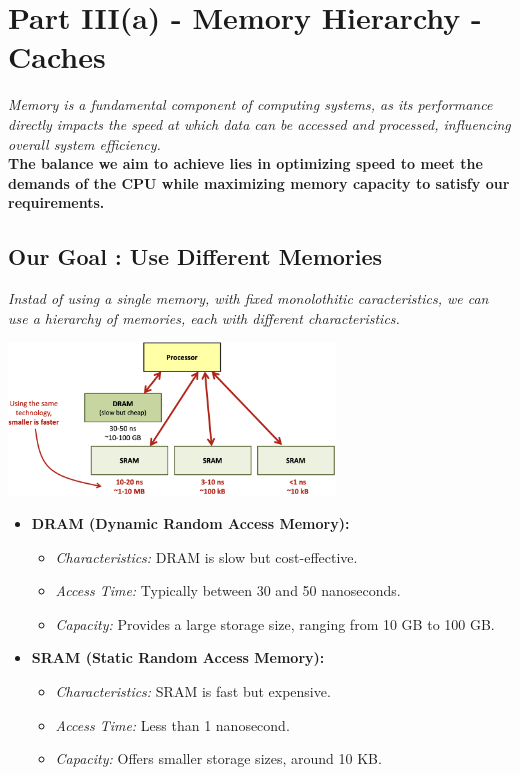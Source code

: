 \chapter{Part III(a) - Memory Hierarchy - Caches}
\textit{Memory is a fundamental component of computing systems, as its performance directly impacts the speed at which data can be accessed and processed, influencing overall system efficiency.} \\
\textbf{The balance we aim to achieve lies in optimizing speed to meet the demands of the CPU while maximizing memory capacity to satisfy our requirements.}
\section{Our Goal : Use Different Memories}
\textit{Instad of using a single memory, with fixed monolothitic caracteristics, we can use a hierarchy of memories, each with different characteristics.}
\begin{center}
    \includegraphics[width=0.65\textwidth]{chapters/chapter3a/images/hierarchy.png}
\end{center}
\begin{itemize}
    \item \textbf{DRAM (Dynamic Random Access Memory):}
    \begin{itemize}
        \item \textit{Characteristics:} DRAM is slow but cost-effective.
        \item \textit{Access Time:} Typically between 30 and 50 nanoseconds.
        \item \textit{Capacity:} Provides a large storage size, ranging from 10 GB to 100 GB.
    \end{itemize}
    
    \item \textbf{SRAM (Static Random Access Memory):}
    \begin{itemize}
        \item \textit{Characteristics:} SRAM is fast but expensive.
        \item \textit{Access Time:} Less than 1 nanosecond.
        \item \textit{Capacity:} Offers smaller storage sizes, around 10 KB.
    \end{itemize}
\end{itemize}

